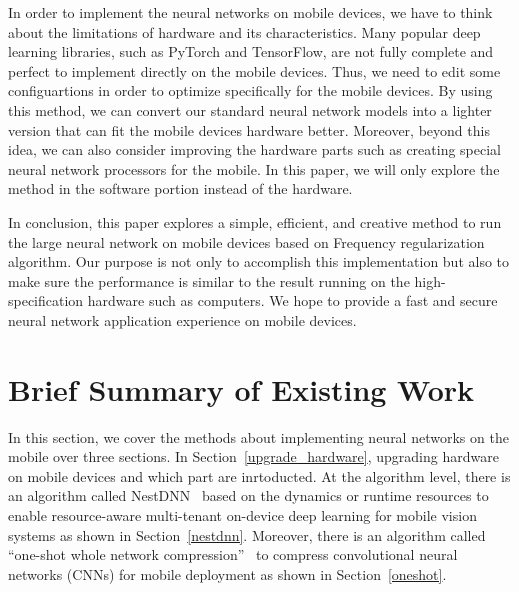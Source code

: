 \documentclass{article}
\begin{document}
In order to implement the neural networks on mobile devices, we have to think about the limitations of hardware and its characteristics. Many popular deep learning libraries, such as PyTorch and TensorFlow, are not fully complete and perfect to implement directly on the mobile devices. Thus, we need to edit some configuartions in order to optimize specifically for the mobile devices. By using this method, we can convert our standard neural network models into a lighter version that can fit the mobile devices hardware better. Moreover, beyond this idea, we can also consider improving the hardware parts such as creating special neural network processors for the mobile. In this paper, we will only explore the method in the software portion instead of the hardware.

In conclusion, this paper explores a simple, efficient, and creative method to run the large neural network on mobile devices based on Frequency regularization algorithm. Our purpose is not only to accomplish this implementation but also to make sure the performance is similar to the result running on the high-specification hardware such as computers. We hope to provide a fast and secure neural network application experience on mobile devices.



\section*{Brief Summary of Existing Work}

In this section, we cover the methods about implementing neural networks on the mobile over three sections. In Section~\ref{upgrade_hardware}, upgrading hardware on mobile devices and which part are inrtoducted. At the algorithm level, there is an algorithm called NestDNN~\cite{fang2018nestdnn} based on the dynamics or runtime resources to enable resource-aware multi-tenant on-device deep learning for mobile vision systems as shown in Section~\ref{nestdnn}. Moreover, there is an algorithm called “one-shot whole network compression”~\cite{kim2016compression} to compress convolutional neural networks (CNNs) for mobile deployment as shown in Section~\ref{oneshot}.
\end{document}
